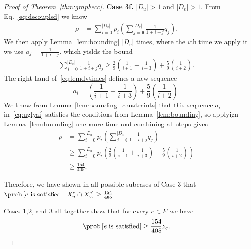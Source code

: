 \begin{proof}[Proof of Theorem~\ref{thm:graphecc}]
	\textbf{Case 3f.} $|D_u| > 1$ and $|D_v| > 1$.
	From Eq.~\eqref{eq:decoupled} we know
	\begin{align*}
		\rho &= \sum_{i = 0}^{|D_u|}  p_i \left(\sum_{j = 0}^{|D_v|} \frac{1}{1+i+j}  q_j \right).
	\end{align*}
	We then apply Lemma~\ref{lem:bounding} $|D_v|$ times, where the $i$th time we apply it we use $a_j = \frac{1}{1+i+j}$. 
	which yields the bound
	\begin{align}
		\label{eq:lemdvtimes}
		\sum_{j = 0}^{|D_v|} \frac{1}{1+i+j}  q_j \geq \frac{2}{9}\left( \frac{1}{i+1} + \frac{1}{i+3} \right) + \frac{5}{9} \left( \frac{1}{i+2} \right).
	\end{align}
	The right hand of~\eqref{eq:lemdvtimes} defines a new sequence
	\begin{equation}
		\label{eq:uglyai}
		a_i = \left( \frac{1}{i+1} + \frac{1}{i+3} \right) + \frac{5}{9} \left( \frac{1}{i+2} \right).
	\end{equation}
	We know from Lemma~\ref{lem:bounding_constraints} that this sequence $a_i$ in~\eqref{eq:uglyai} satisfies the conditions from Lemma~\ref{lem:bounding}, so applyign Lemma~\ref{lem:bounding} one more time and combining all steps gives
	\begin{align*}
		\rho &= \sum_{i = 0}^{|D_u|}  p_i \left(\sum_{j = 0}^{|D_v|} \frac{1}{1+i+j}  q_j \right)\\
		& \geq \sum_{i = 0}^{|D_u|}  p_i \left( \frac{2}{9}\left( \frac{1}{i+1} + \frac{1}{i+3} \right) + \frac{5}{9} \left( \frac{1}{i+2} \right) \right) \\
		&\geq \frac{154}{405}.
	\end{align*}
	
	Therefore, we have shown in all possible subcases of Case 3 that $\prob\left[ \text{$e$ is satisfied} \mid X_u^c \cap X_v^c \right] \geq \frac{154}{405}$. 
	
	Cases 1,2, and 3 all together show that for every $e \in E$ we have
	\[
	\prob\left[ \text{$e$ is satisfied} \right] \geq \frac{154}{405} z_e.
	\]
\end{proof}